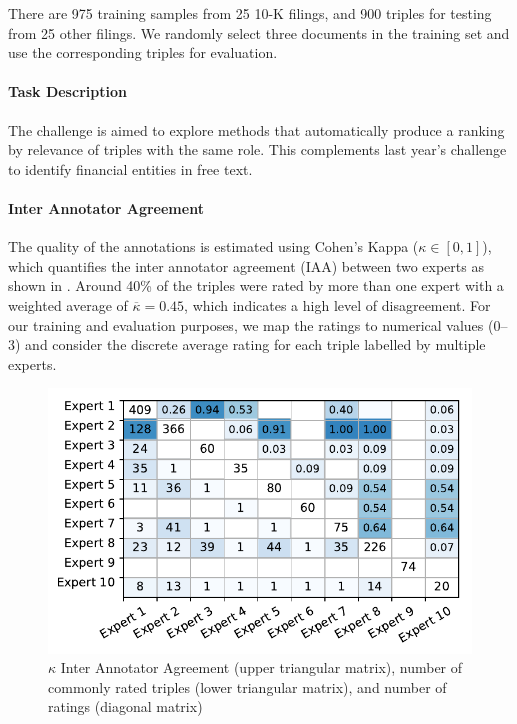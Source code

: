 There are 975 training samples from 25 10-K filings, and 900 triples for testing from 25 other filings. We randomly select three documents in the training set and use the corresponding triples for evaluation.


{\setlength{\parindent}{0cm}
\paragraph{\textbf{Task Description}}
The challenge is aimed to explore methods that automatically produce a ranking by relevance of triples with the same role.
This complements last year's challenge to identify financial entities in free text\cite{dsmm16}.
}

{\setlength{\parindent}{0cm}
\paragraph{\textbf{Inter Annotator Agreement}}
The quality of the annotations is estimated using Cohen's Kappa\cite{ir} ($\kappa\in [0,1]$), which quantifies the inter annotator agreement (IAA) between two experts as shown in .
Around 40\% of the triples were rated by more than one expert with a weighted average of $\overline{\kappa}=0.45$, which indicates a high level of disagreement.
For our training and evaluation purposes, we map the ratings to numerical values (0--3) and consider the discrete average rating for each triple labelled by multiple experts.
}

\begin{figure}[b]
	\includegraphics[width=0.8\linewidth]{iaa}
	\caption{$\kappa$ Inter Annotator Agreement (upper triangular matrix), number of commonly rated triples (lower triangular matrix), and number of ratings (diagonal matrix)}
	\label{fig:iaa}
\end{figure}

